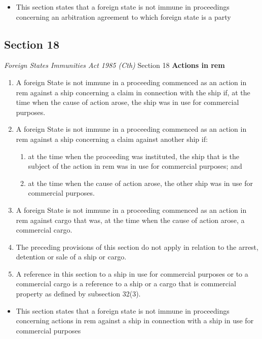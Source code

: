 \begin{itemize}
    \item This section states that a foreign state is not immune in proceedings concerning an arbitration agreement to which foreign state is a party
\end{itemize}

\subsection{Section 18}
\begin{statutedetails}{\textit{Foreign States Immunities Act 1985 (Cth)} Section 18}
    \flushleft
    \textbf{Actions in rem}
    \begin{enumerate}[label=(\arabic*)]
        \item A foreign State is not immune in a proceeding commenced as an action in rem against a ship concerning a claim in connection with the ship if, at the time when the cause of action arose, the ship was in use for commercial purposes.
        \item A foreign State is not immune in a proceeding commenced as an action in rem against a ship concerning a claim against another ship if:
        \begin{enumerate}[label=(\alph*)]
            \item at the time when the proceeding was instituted, the ship that is the subject of the action in rem was in use for commercial purposes; and
            \item at the time when the cause of action arose, the other ship was in use for commercial purposes.
        \end{enumerate}
        \item A foreign State is not immune in a proceeding commenced as an action in rem against cargo that was, at the time when the cause of action arose, a commercial cargo.
        \item The preceding provisions of this section do not apply in relation to the arrest, detention or sale of a ship or cargo.
        \item A reference in this section to a ship in use for commercial purposes or to a commercial cargo is a reference to a ship or a cargo that is commercial property as defined by subsection 32(3).
    \end{enumerate}
\end{statutedetails}

\begin{itemize}
    \item This section states that a foreign state is not immune in proceedings concerning actions in rem against a ship in connection with a ship in use for commercial purposes
\end{itemize}

